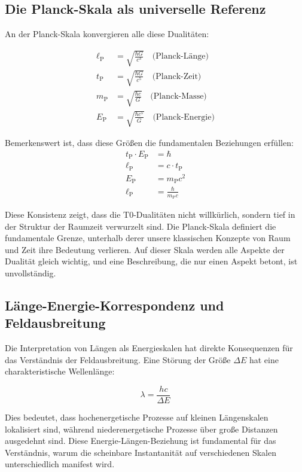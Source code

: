 \documentclass[12pt,a4paper]{article}
\newcommand{\lP}{\ell_{\text{P}}}
\newcommand{\mP}{m_{\text{P}}}
\newcommand{\EP}{E_{\text{P}}}
\newcommand{\tP}{t_{\text{P}}}
\begin{document}
	\subsection{Die Planck-Skala als universelle Referenz}
	
	An der Planck-Skala konvergieren alle diese Dualitäten:
	
	\begin{align}
		\lP &= \sqrt{\frac{\hbar G}{c^3}} \quad \text{(Planck-Länge)} \\
		\tP &= \sqrt{\frac{\hbar G}{c^5}} \quad \text{(Planck-Zeit)} \\
		\mP &= \sqrt{\frac{\hbar c}{G}} \quad \text{(Planck-Masse)} \\
		\EP &= \sqrt{\frac{\hbar c^5}{G}} \quad \text{(Planck-Energie)}
	\end{align}
	
	Bemerkenswert ist, dass diese Größen die fundamentalen Beziehungen erfüllen:
	\begin{align}
		\tP \cdot \EP &= \hbar \\
		\lP &= c \cdot \tP \\
		\EP &= \mP c^2 \\
		\lP &= \frac{\hbar}{\mP c}
	\end{align}
	
	Diese Konsistenz zeigt, dass die T0-Dualitäten nicht willkürlich, sondern tief in der Struktur der Raumzeit verwurzelt sind. Die Planck-Skala definiert die fundamentale Grenze, unterhalb derer unsere klassischen Konzepte von Raum und Zeit ihre Bedeutung verlieren. Auf dieser Skala werden alle Aspekte der Dualität gleich wichtig, und eine Beschreibung, die nur einen Aspekt betont, ist unvollständig.
	
	\subsection{Länge-Energie-Korrespondenz und Feldausbreitung}
	
	Die Interpretation von Längen als Energieskalen hat direkte Konsequenzen für das Verständnis der Feldausbreitung. Eine Störung der Größe $\Delta E$ hat eine charakteristische Wellenlänge:
	
	\begin{equation}
		\lambda = \frac{hc}{\Delta E}
	\end{equation}
	
	Dies bedeutet, dass hochenergetische Prozesse auf kleinen Längenskalen lokalisiert sind, während niederenergetische Prozesse über große Distanzen ausgedehnt sind. Diese Energie-Längen-Beziehung ist fundamental für das Verständnis, warum die scheinbare Instantanität auf verschiedenen Skalen unterschiedlich manifest wird.
	
\end{document}
